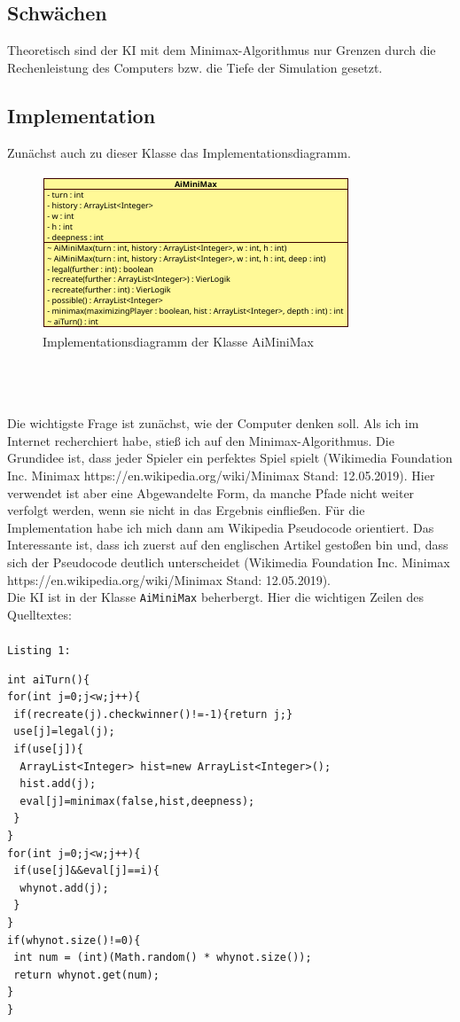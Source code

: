 \documentclass[12pt,a4paper]{article}
\def\code#1{\texttt{#1}}
\begin{document}
	\subsection{Schwächen}
	Theoretisch sind der KI mit dem Minimax-Algorithmus nur Grenzen durch die Rechenleistung des Computers bzw. die Tiefe der Simulation gesetzt.
	
	\subsection{Implementation}
	Zunächst auch zu dieser Klasse das Implementationsdiagramm.
\begin{figure}[h]
	\centering
	\includegraphics[width=0.7\linewidth, height=0.3\textheight]{maybe/KlassendiagrammKI}
	\caption{Implementationsdiagramm der Klasse AiMiniMax}
	\label{fig:klassendiagrammki}
\end{figure}\\\\\\
	Die wichtigste Frage ist zunächst, wie der Computer \glqq denken\grqq{} soll. Als ich im Internet recherchiert habe, stieß ich auf den Minimax-Algorithmus. Die Grundidee ist, dass jeder Spieler ein  \glqq perfektes\grqq{} Spiel spielt (Wikimedia Foundation Inc. \glqq Minimax\grqq{} https://en.wikipedia.org/wiki/Minimax Stand: 12.05.2019). Hier verwendet ist aber eine Abgewandelte Form, da manche Pfade nicht weiter verfolgt werden, wenn sie nicht in das Ergebnis einfließen. Für die Implementation habe ich mich dann am Wikipedia Pseudocode orientiert. Das Interessante ist, dass ich zuerst auf den englischen Artikel gestoßen bin und, dass sich der Pseudocode deutlich unterscheidet (Wikimedia Foundation Inc. \glqq Minimax\grqq{} https://en.wikipedia.org/wiki/Minimax Stand: 12.05.2019).\\
		Die KI ist in der Klasse \code{AiMiniMax} beherbergt. Hier die wichtigen Zeilen des Quelltextes:\\\\
		\code{Listing 1:}
		\begin{lstlisting}
int aiTurn(){
for(int j=0;j<w;j++){
 if(recreate(j).checkwinner()!=-1){return j;}
 use[j]=legal(j);
 if(use[j]){
  ArrayList<Integer> hist=new ArrayList<Integer>();
  hist.add(j);
  eval[j]=minimax(false,hist,deepness);
 }
}
for(int j=0;j<w;j++){
 if(use[j]&&eval[j]==i){
  whynot.add(j);
 }
}
if(whynot.size()!=0){
 int num = (int)(Math.random() * whynot.size());
 return whynot.get(num);
}
}
\end{lstlisting}
\end{document}
